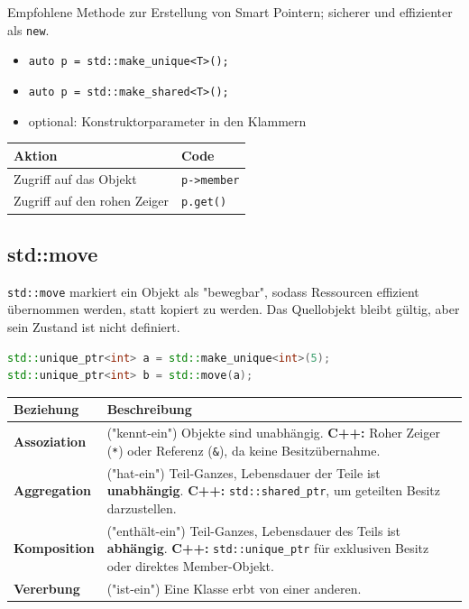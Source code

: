 \documentclass[9pt, landscape]{article}
\begin{document}
\begin{multicols*}{4}
\begingroup\sloppy
Empfohlene Methode zur Erstellung von Smart Pointern; sicherer und effizienter als \lstinline|new|.
\begin{itemize}
    \item \lstinline|auto p = std::make_unique<T>();|
    \item \lstinline|auto p = std::make_shared<T>();| 
    \item optional: Konstruktorparameter in den Klammern
\end{itemize}

\noindent
\begin{tabularx}{\linewidth}{l l}
\toprule
\textbf{Aktion} & \textbf{Code} \\
\midrule
Zugriff auf das Objekt & \lstinline|p->member| \\
Zugriff auf den rohen Zeiger & \lstinline|p.get()| \\
\bottomrule
\end{tabularx}


\endgroup

\subsection*{std::move}
\lstinline|std::move| markiert ein Objekt als "bewegbar", sodass Ressourcen effizient übernommen werden, statt kopiert zu werden. Das Quellobjekt bleibt gültig, aber sein Zustand ist nicht definiert.
\begin{lstlisting}[language=C++]
std::unique_ptr<int> a = std::make_unique<int>(5);
std::unique_ptr<int> b = std::move(a); 
\end{lstlisting}

\noindent
\begin{tabularx}{\linewidth}{l >{\RaggedRight}X}
\toprule
\textbf{Beziehung} & \textbf{Beschreibung } \\
\midrule
\textbf{Assoziation} & ("kennt-ein") Objekte sind unabhängig. \newline
\textbf{C++:} Roher Zeiger (\texttt{*}) oder Referenz (\texttt{\&}), da keine Besitzübernahme. \\

\textbf{Aggregation} & ("hat-ein") Teil-Ganzes, Lebensdauer der Teile ist \textbf{unabhängig}. \newline
\textbf{C++:} \texttt{std::shared\_ptr}, um geteilten Besitz darzustellen. \\


\textbf{Komposition} & ("enthält-ein") Teil-Ganzes, Lebensdauer des Teils ist \textbf{abhängig}. \newline
\textbf{C++:} \texttt{std::unique\_ptr} für exklusiven Besitz oder direktes Member-Objekt. \\
\textbf{Vererbung} & ("ist-ein") Eine Klasse erbt von einer anderen. \\
\bottomrule
\end{tabularx}


\end{multicols*}
\end{document}
